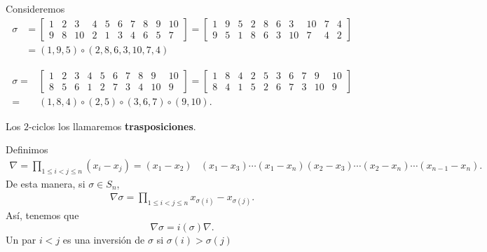 \begin{eg}
\normalfont Consideremos 
\[
\begin{split}
	\sigma & = \begin{bmatrix} 1 & 2 & 3 & 4 & 5 & 6 & 7 & 8 & 9 & 10  \\  9 & 8 & 10 & 2 & 1 & 3 & 4 & 6 & 5 & 7 \end{bmatrix} = \begin{bmatrix} 1 & 9 & 5 & 2 & 8 & 6 & 3 & 10 & 7 & 4\\
9 & 5 & 1 & 8 & 6 & 3 & 10 & 7 & 4 & 2\end{bmatrix} \\
& = \left(1, 9, 5\right) \circ \left(2, 8, 6, 3, 10, 7, 4\right)
\end{split}
\]
\end{eg}
\begin{eg}
\normalfont 
\[
\begin{split}
	\sigma = & \begin{bmatrix} 1 & 2 & 3 & 4 & 5 & 6 & 7 & 8 & 9 & 10 \\
		8 & 5 & 6 & 1 & 2 & 7 & 3 & 4 & 10 & 9\end{bmatrix} = \begin{bmatrix} 1 & 8 & 4 & 2 & 5 & 3 & 6 & 7 & 9 & 10 \\ 8 & 4 & 1 & 5 & 2 & 6 & 7 & 3 & 10 & 9\end{bmatrix} \\
		= & \left(1,8, 4\right) \circ \left(2, 5\right) \circ \left(3, 6, 7\right) \circ \left(9, 10\right).
\end{split}
\]
\end{eg}

\begin{fdefinition}[]
\normalfont Los $\displaystyle 2 $-ciclos los llamaremos \textbf{trasposiciones}.
\end{fdefinition}

Definimos 
\[
\begin{split}
	\nabla =  \prod_{1 \leq i < j \leq n} \left(x_{i}-x_{j}\right) = \left(x_{1}-x_{2}\right) &\left(x_{1}-x_{3}\right) \cdots \left(x_{1}-x_{n}\right) 
		  \left(x_{2}-x_{3}\right) \cdots \left(x_{2}-x_{n}\right) \cdots \left(x_{n-1}-x_{n}\right).
\end{split}
\]
De esta manera, si $\displaystyle \sigma \in S_{n} $, 
\[
\begin{split}
\nabla\sigma  = \prod_{1 \leq i < j \leq n}x_{\sigma\left(i\right)}-x_{\sigma\left(j\right)} .
\end{split}
\]
Así, tenemos que 
\[\nabla \sigma = i\left(\sigma \right)\nabla  .\]
Un par $\displaystyle i < j $ es una inversión de $\displaystyle \sigma  $ si $\displaystyle \sigma\left(i\right) > \sigma\left(j\right)$ 
